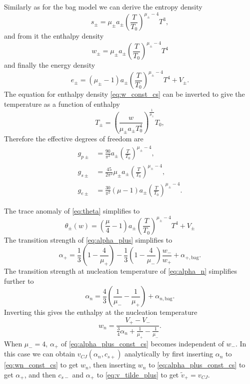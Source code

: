 Similarly as for the bag model we can derive the entropy density
\begin{equation}
s_\pm = \mu_\pm a_\pm \left( \frac{T}{T_0} \right)^{\mu_\pm - 4} T^3,
\end{equation}
and from it the enthalpy density
\begin{equation}
w_\pm = \mu_\pm a_\pm \left( \frac{T}{T_0} \right)^{\mu_\pm - 4} T^4
\label{eq:w_const_cs}
\end{equation}
and finally the energy density
\begin{equation}
e_\pm = (\mu_\pm - 1) a_\pm \left( \frac{T}{T_0} \right)^{\mu_\pm - 4} T^4 + V_\pm.
\end{equation}
The equation for enthalpy density \eqref{eq:w_const_cs} can be inverted to give the temperature as a function of enthalpy
\begin{equation}
T_\pm = \left( \frac{w}{\mu_\pm a_\pm T_0^4} \right)^\frac{1}{\mu_\pm} T_0,
\end{equation}
Therefore the effective degrees of freedom are
\begin{align}
g_{p\pm} &= \frac{90}{\pi^2} a_\pm \left( \frac{T}{T_0} \right)^{\mu_\pm - 4}, \\
g_{s\pm} &= \frac{45}{2\pi^2} \mu_\pm a_\pm \left( \frac{T}{T_0} \right)^{\mu_\pm - 4}, \\
g_{e\pm} &= \frac{30}{\pi^2} (\mu - 1) a_\pm \left( \frac{T}{T_0} \right)^{\mu_\pm - 4}.
\end{align}


The trace anomaly of \eqref{eq:theta} simplifies to
\begin{equation}
\theta_\pm(w) = \left( \frac{\mu}{4} - 1 \right) a_\pm \left( \frac{T}{T_0} \right)^{\mu_\pm - 4} T^4 + V_\pm
\end{equation}
The transition strength of \eqref{eq:alpha_plus} simplifies to
\begin{equation}
\alpha_+ = \frac{1}{3} \left( 1 - \frac{4}{\mu_+} \right) - \frac{1}{3} \left(1 - \frac{4}{\mu_-} \right) \frac{w_-}{w_+} + \alpha_{+,\text{bag}}.
\label{eq:alpha_plus_const_cs}
\end{equation}
The transition strength at nucleation temperature of \eqref{eq:alpha_n} simplifies further to
\begin{equation}
\alpha_n = \frac{4}{3} \left( \frac{1}{\mu_-} - \frac{1}{\mu_+} \right) + \alpha_{n,\text{bag}}.
\end{equation}
Inverting this gives the enthalpy at the nucleation temperature
\begin{equation}
w_n = \frac{V_+ - V_-}{ \frac{3}{4} \alpha_n + \frac{1}{\mu_+} - \frac{1}{\mu_-} }.
\label{eq:wn_const_cs}
\end{equation}
When $\mu_- = 4$, $\alpha_+$ of \eqref{eq:alpha_plus_const_cs} becomes independent of $w_-$.
In this case we can obtain $v_{CJ}(\alpha_n, c_{s+})$ analytically by first inserting $\alpha_n$ to \eqref{eq:wn_const_cs} to get $w_n$,
then inserting $w_n$ to \eqref{eq:alpha_plus_const_cs} to get $\alpha_+$, and then $c_{s-}$ and $\alpha_+$ to \eqref{eq:v_tilde_plus} to get $\tilde{v}_+ = v_{CJ}$.

